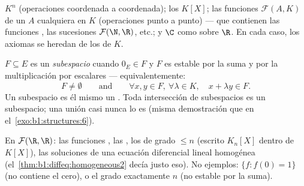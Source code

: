 \begin{example}\label{ex:b1:vspaces:examples}
$K^n$ (operaciones coordenada a coordenada); los 
$K[X]$; las funciones $\mathcal{F}(A, K)$ de un  $A$
cualquiera en $K$ (operaciones punto a punto) --- que contienen las
funciones , las sucesiones $\mathcal{F}(\N, \R)$, etc.;
y $\C$ como  sobre $\R$. En cada caso, los axiomas
se heredan de los de $K$.
\end{example}

\begin{definition}[Subespacio]\label{def:b1:vspaces:subspace}
$F \subseteq E$ es un \emph{subespacio} cuando
$0_E \in F$ y $F$ es estable por la suma y por la multiplicación por
escalares --- equivalentemente:
\[
F \neq \emptyset
\qquad\text{and}\qquad
\forall x, y \in F,\ \forall \lambda \in K,\quad
x + \lambda y \in F .
\]
Un subespacio es él mismo un . Toda intersección de
subespacios es un subespacio; una unión casi nunca lo es (misma
demostración que en el~\cref{exo:b1:structures:6}).
\end{definition}

\begin{example}\label{ex:b1:vspaces:subspaces}
En $\mathcal{F}(\R, \R)$: las funciones , las ,
los  de grado $\leq n$ (escrito $K_n[X]$ dentro de
$K[X]$), las soluciones de una ecuación diferencial lineal homogénea
(el~\cref{thm:b1:diffeq:homogeneous2} decía justo eso). No ejemplos:
$\{f : f(0) = 1\}$ (no contiene el cero), o el grado exactamente $n$
(no estable por la suma).
\end{example}

